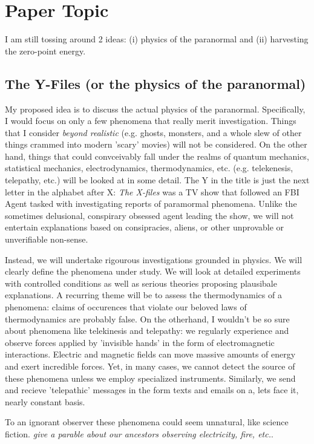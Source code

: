 \documentclass[prb,aps,11pt,superscriptaddress,floatfix]{revtex4-2}
\begin{document}
\section{Paper Topic}

I am still tossing around 2 ideas: (i) physics of the paranormal and (ii) harvesting the zero-point energy.

\subsection{The Y-Files (or the physics of the paranormal)}
My proposed idea is to discuss the actual physics of the paranormal. Specifically, I would focus on only a few phenomena that really merit investigation. Things that I consider \emph{beyond realistic} (e.g. ghosts, monsters, and a whole slew of other things crammed into modern 'scary' movies) will not be considered. On the other hand, things that could convceivably fall under the realms of quantum mechanics, statistical mechanics, electrodynamics, thermodynamics, etc. (e.g. telekenesis, telepathy, etc.) will be looked at in some detail. The Y in the title is just the next letter in the alphabet after X: \emph{The X-files} was a TV show that followed an FBI Agent tasked with investigating reports of paramormal phenomena. Unlike the sometimes delusional, conspirary obsessed agent leading the show, we will not entertain explanations based on consipracies, aliens, or other unprovable or unverifiable non-sense.

Instead, we will undertake rigourous investigations grounded in physics. We will clearly define the phenomena under study. We will look at detailed experiments with controlled conditions as well as serious theories proposing plausibale explanations. A recurring theme will be to assess the thermodynamics of a phenomena: claims of occurences that violate our beloved laws of thermodynamics are probably false. On the otherhand, I wouldn't be so sure about phenomena like telekinesis and telepathy: we regularly experience and observe forces applied by 'invisible hands' in the form of electromagnetic interactions. Electric and magnetic fields can move massive amounts of energy and exert incredible forces. Yet, in many cases, we cannot detect the source of these phenomena unless we employ specialized instruments. Similarly, we send and recieve 'telepathic' messages in the form texts and emails on a, lets face it, nearly constant basis. 

To an ignorant observer these phenomena could seem unnatural, like science fiction. \emph{give a parable about our ancestors observing electricity, fire, etc.}. 
\end{document}

